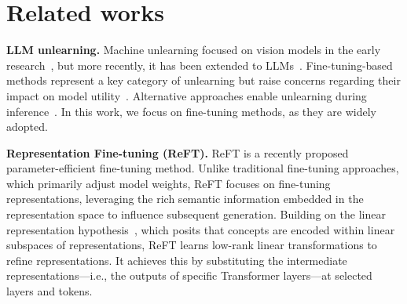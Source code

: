 \section{Related works}
\label{sec:related_works}

\textbf{LLM unlearning.} Machine unlearning focused on vision models in the early research~\cite{cao2015towards, warnecke2021machine, bourtoule2021machine, kurmanji2024towards, ren2024copyright, li2021online}, but more recently, it has been extended to LLMs~\cite{eldan2023s, yao2023large, shi2024muse, liu2024rethinking}. %
Fine-tuning-based methods represent a key category of unlearning but raise concerns regarding their impact on model utility~\cite{thaker2024position, deeb2024unlearning, doshi2024does, lynch2024eight}. Alternative approaches enable unlearning during inference~\cite{wang2024machine, eldan2023s, ji2024reversing, thaker2024guardrail, liu2024large}. In this work, we focus on fine-tuning methods, as they are widely adopted.

\textbf{Representation Fine-tuning (ReFT).} ReFT \cite{wu2024reft} is a recently proposed parameter-efficient fine-tuning method. Unlike traditional fine-tuning approaches, which primarily adjust model weights, ReFT focuses on fine-tuning representations, leveraging the rich semantic information embedded in the representation space to influence subsequent generation. Building on the linear representation hypothesis~\cite{park2023linear}, which posits that concepts are encoded within linear subspaces of representations, ReFT learns low-rank linear transformations to refine representations. It achieves this by substituting the intermediate representations—i.e., the outputs of specific Transformer layers—at selected layers and tokens.
